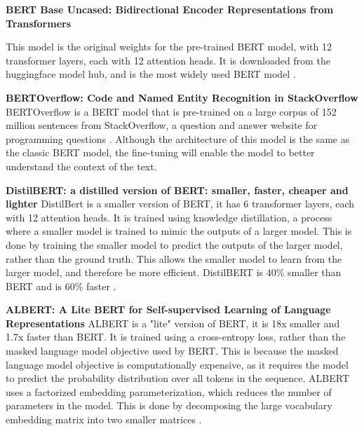 \documentclass{UoYCSproject}
\begin{document}
    \par

    \textbf{BERT Base Uncased: Bidirectional Encoder Representations from Transformers}

    This model is the original weights for the pre-trained BERT model, with 12 transformer layers, each with 12 attention heads.
    It is downloaded from the huggingface model hub, and is the most widely used BERT model \cite{bert-base-uncased}.
    \par

    \textbf{BERTOverflow: Code and Named Entity Recognition in StackOverflow}
    BERTOverflow is a BERT model that is pre-trained on a large corpus of 152 million sentences from StackOverflow, a question and answer website for programming questions \cite{tabassum2020code}.
    Although the architecture of this model is the same as the classic BERT model, the fine-tuning will enable the model to better understand the context of the text.
    \par

    \textbf{DistilBERT: a distilled version of BERT: smaller, faster, cheaper and lighter}
    DistilBert is a smaller version of BERT, it has 6 transformer layers, each with 12 attention heads.
    It is trained using knowledge distillation, a process where a smaller model is trained to mimic the outputs of a larger model.
    This is done by training the smaller model to predict the outputs of the larger model, rather than the ground truth.
    This allows the smaller model to learn from the larger model, and therefore be more efficient.
    DistilBERT is 40\% smaller than BERT and is 60\% faster \cite{sanh2020distilbert}.
    \par

    \textbf{ALBERT: A Lite BERT for Self-supervised Learning of Language Representations}
    ALBERT is a "lite" version of BERT, it is 18x smaller and 1.7x faster than BERT.
    It is trained using a cross-entropy loss, rather than the masked language model objective used by BERT.
    This is because the masked language model objective is computationally expensive, as it requires the model to predict the probability distribution over all tokens in the sequence.
    ALBERT uses a factorized embedding parameterization, which reduces the number of parameters in the model.
    This is done by decomposing the large vocabulary embedding matrix into two smaller matrices \cite{sanh2020distilbert}.
    \par
\end{document}
